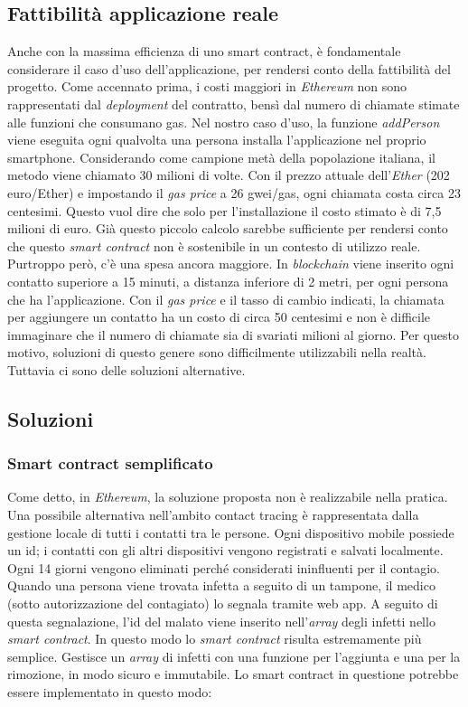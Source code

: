 \subsection{Fattibilità applicazione reale}
Anche con la massima efficienza di uno smart contract, è fondamentale considerare il caso d’uso dell’applicazione, per rendersi conto della fattibilità del progetto.
Come accennato prima, i costi maggiori in \textit{Ethereum} non sono rappresentati dal \textit{deployment} del contratto, bensì dal numero di chiamate stimate alle funzioni che consumano gas.
Nel nostro caso d’uso, la funzione \textit{addPerson} viene eseguita ogni qualvolta una persona installa l’applicazione nel proprio smartphone. Considerando come campione metà della popolazione italiana, il metodo viene chiamato 30 milioni di volte. Con il prezzo attuale dell'\textit{Ether} (202 euro/Ether) e impostando il \textit{gas price} a 26 gwei/gas, ogni chiamata costa circa 23 centesimi. Questo vuol dire che solo per l’installazione il costo stimato è di 7,5 milioni di euro.
Già questo piccolo calcolo sarebbe sufficiente per rendersi conto che questo \textit{smart contract} non è sostenibile in un contesto di utilizzo reale. Purtroppo però, c’è una spesa ancora maggiore. In \textit{blockchain} viene inserito ogni contatto superiore a 15 minuti, a distanza inferiore di 2 metri, per ogni persona che ha l’applicazione. Con il \textit{gas price} e il tasso di cambio indicati, la chiamata per aggiungere un contatto ha un costo di circa 50 centesimi e non è difficile immaginare che il numero di chiamate sia di svariati milioni al giorno. Per questo motivo, soluzioni di questo genere sono difficilmente utilizzabili nella realtà.
Tuttavia ci sono delle soluzioni alternative.
\\
\subsection{Soluzioni}
\subsubsection{Smart contract semplificato}
Come detto, in \textit{Ethereum}, la soluzione proposta non è realizzabile nella pratica. Una possibile alternativa nell’ambito contact tracing è rappresentata dalla gestione locale di tutti i contatti tra le persone. Ogni dispositivo mobile possiede un id; i contatti con gli altri dispositivi vengono registrati e salvati localmente. Ogni 14 giorni vengono eliminati perché considerati ininfluenti per il contagio.
Quando una persona viene trovata infetta a seguito di un tampone, il medico (sotto autorizzazione del contagiato) lo segnala tramite web app. A seguito di questa segnalazione, l’id del malato viene inserito nell’\textit{array} degli infetti nello \textit{smart contract}. 
In questo modo lo \textit{smart contract} risulta estremamente più semplice. Gestisce un \textit{array} di infetti con una funzione per l'aggiunta e una per la rimozione, in modo sicuro e immutabile.
Lo smart contract in questione potrebbe essere implementato in questo modo:

